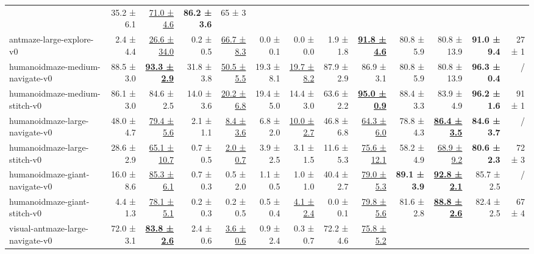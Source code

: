 \documentclass{article} %
\begin{document}
\begin{table}[ht]
\begin{tabular*}{\linewidth}{@{\extracolsep{\fill}} l 
    r r  %
    r r  %
    r r  %
    r r  %
    r r  %
    r    %
    r    %
}
& 35.2 ± 6.1  & \underline{71.0 ± 4.6}
& \textbf{86.2 ± 3.6} & 65 ± 3 \\
antmaze-large-explore-v0     
& 2.4 ± 4.4   & \underline{26.6 ± 34.0} 
& 0.2 ± 0.5 & \underline{66.7 ± 8.3}          
& 0.0 ± 0.1   & 0.0 ± 0.0                    
& 1.9 ± 1.8 & \textbf{\underline{91.8 ± 4.6}} 
& 80.8 ± 5.9 & 80.8 ± 13.9
& \textbf{91.0 ± 9.4} & 27 ± 1 \\
\midrule
humanoidmaze-medium-navigate-v0
  & 88.5 ± 3.0          & \underline{\textbf{93.3 ± 2.9}}
  & 31.8 ± 3.8          & \underline{50.5 ± 5.5}
  & 19.3 ± 8.1          & \underline{19.7 ± 8.2}
  & 87.9 ± 2.9          & 86.9 ± 3.1 
  & 80.8 ± 5.9          & 80.8 ± 13.9
  & \textbf{96.3 ± 0.4} & / \\
humanoidmaze-medium-stitch-v0
  & 86.1 ± 3.0          & 84.6 ± 2.5
  & 14.0 ± 3.6          & \underline{20.2 ± 6.8}
  & 19.4 ± 5.0          & 14.4 ± 3.0
  & 63.6 ± 2.2          & \underline{\textbf{95.0 ± 0.9}} 
  & 88.4 ± 3.3          & 83.9 ± 4.9
  & \textbf{96.2 ± 1.6} & 91 ± 1 \\
  humanoidmaze-large-navigate-v0
  & 48.0 ± 4.7          & \underline{79.4 ± 5.6}
  & 2.1 ± 1.1           & \underline{8.4 ± 3.6}
  & 6.8 ± 2.0           & \underline{10.0 ± 2.7}
  & 46.8 ± 6.8          & \underline{64.3 ± 6.0} 
  & 78.8 ± 4.3          & \underline{\textbf{86.4 ± 3.5}}
  & \textbf{84.6 ± 3.7} & / \\
humanoidmaze-large-stitch-v0
  & 28.6 ± 2.9          & \underline{65.1 ± 10.7}
  & 0.7 ± 0.5           & \underline{2.0 ± 0.7}
  & 3.9 ± 2.5           & 3.1 ± 1.5
  & 11.6 ± 5.3          & \underline{75.6 ± 12.1} 
  & 58.2 ± 4.9          & \underline{68.9 ± 9.2}
  & \textbf{80.6 ± 2.3} & 72 ± 3 \\
humanoidmaze-giant-navigate-v0 
& 16.0 ± 8.6 & \underline{85.3 ± 6.1} 
& 0.7 ± 0.3 & 0.5 ± 2.0                   
& 1.1 ± 0.5   & 1.0 ± 1.0                    
& 40.4 ± 2.7 & \underline{79.0 ± 5.3} 
& \textbf{89.1 ± 3.9} & \underline{\textbf{92.8 ± 2.1}}
& 85.7 ± 2.5 & / \\
humanoidmaze-giant-stitch-v0 
& 4.4 ± 1.3   & \underline{78.1 ± 5.1} 
& 0.2 ± 0.3 & 0.2 ± 0.5                   
& 0.5 ± 0.4   & \underline{4.1 ± 2.4}        
& 0.0 ± 0.1 & \underline{79.8 ± 5.6}
& 81.6 ± 2.8  & \underline{\textbf{88.8 ± 2.6}}
& 82.4 ± 2.5 & 67 ± 4 \\
\midrule
visual-antmaze-large-navigate-v0 
& 72.0 ± 3.1 & \underline{\textbf{83.8 ± 2.6}} 
& 2.4 ± 0.6 & \underline{3.6 ± 0.6}       
& 0.9 ± 2.4   & 0.3 ± 0.7                    
& 72.2 ± 4.6 & \underline{75.8 ± 5.2} 

\end{tabular*}
\end{table}
\end{document}
